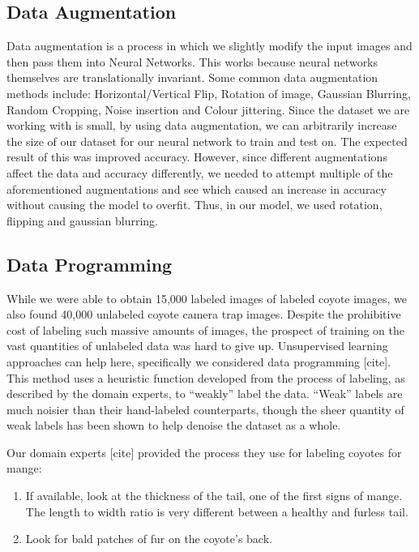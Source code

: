 \documentclass{article}
\begin{document}
\subsection{Data Augmentation}
Data augmentation is a process in which we slightly modify the input images and then pass them into Neural Networks. This works because neural networks themselves are translationally invariant. Some common data augmentation methods include: Horizontal/Vertical Flip, Rotation of image, Gaussian Blurring, Random Cropping, Noise insertion and Colour jittering. Since the dataset we are working with is small, by using data augmentation, we can arbitrarily increase the size of our dataset for our neural network to train and test on. The expected result of this was improved accuracy. However, since different augmentations affect the data and accuracy differently, we needed to attempt multiple of the aforementioned augmentations and see which caused an increase in accuracy without causing the model to overfit. Thus, in our model, we used rotation, flipping and gaussian blurring.
\subsection{Data Programming}
While we were able to obtain 15,000 labeled images of labeled coyote images, we also found 40,000 unlabeled coyote camera trap images. Despite the prohibitive cost of labeling such massive amounts of images, the prospect of training on the vast quantities of unlabeled data was hard to give up. Unsupervised learning approaches can help here, specifically we considered data programming [cite]. This method uses a heuristic function developed from the process of labeling, as described by the domain experts, to “weakly” label the data. “Weak” labels are much noisier than their hand-labeled counterparts, though the sheer quantity of weak labels has been shown to help denoise the dataset as a whole.

Our domain experts [cite] provided the process they use for labeling coyotes for mange:
\begin{enumerate}
    \item If available, look at the thickness of the tail, one of the first signs of mange. The length to width ratio is very different between a healthy and furless tail.
    \item Look for bald patches of fur on the coyote’s back.
\end{enumerate}
\end{document}
